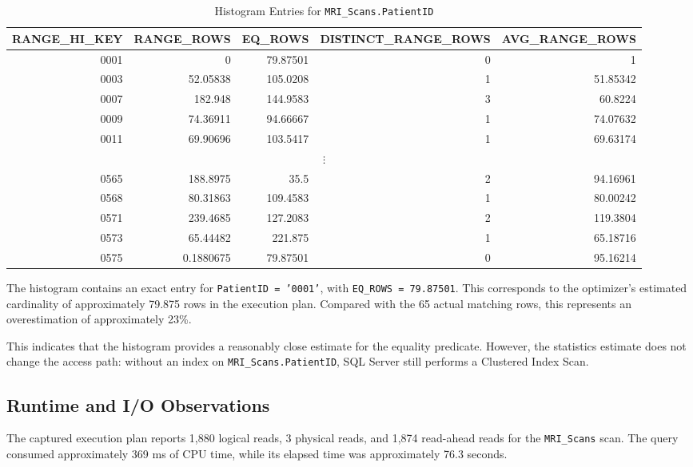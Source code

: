 \begin{table}[htbp]
\centering
\small
\caption{Histogram Entries for \texttt{MRI\_Scans.PatientID}}
\label{tab:q1_patientid_histogram}
\begin{tabular}{|r|r|r|r|r|}
\hline
RANGE\_HI\_KEY & RANGE\_ROWS & EQ\_ROWS &
DISTINCT\_RANGE\_ROWS & AVG\_RANGE\_ROWS \\
\hline
0001 & 0 & 79.87501 & 0 & 1 \\
\hline
0003 & 52.05838 & 105.0208 & 1 & 51.85342 \\
\hline
0007 & 182.948 & 144.9583 & 3 & 60.8224 \\
\hline
0009 & 74.36911 & 94.66667 & 1 & 74.07632 \\
\hline
0011 & 69.90696 & 103.5417 & 1 & 69.63174 \\
\hline
\multicolumn{5}{|c|}{$\vdots$} \\
\hline
0565 & 188.8975 & 35.5 & 2 & 94.16961 \\
\hline
0568 & 80.31863 & 109.4583 & 1 & 80.00242 \\
\hline
0571 & 239.4685 & 127.2083 & 2 & 119.3804 \\
\hline
0573 & 65.44482 & 221.875 & 1 & 65.18716 \\
\hline
0575 & 0.1880675 & 79.87501 & 0 & 95.16214 \\
\hline
\end{tabular}
\end{table}

The histogram contains an exact entry for \texttt{PatientID = '0001'}, with \texttt{EQ\_ROWS = 79.87501}. This corresponds to the optimizer's estimated cardinality of approximately 79.875 rows in the execution plan. Compared with the 65 actual matching rows, this represents an overestimation of approximately 23\%.

This indicates that the histogram provides a reasonably close estimate for the equality predicate. However, the statistics estimate does not change the access path: without an index on \texttt{MRI\_Scans.PatientID}, SQL Server still performs a Clustered Index Scan.

\subsection{Runtime and I/O Observations}

The captured execution plan reports 1,880 logical reads, 3 physical reads, and 1,874 read-ahead reads for the \texttt{MRI\_Scans} scan. The query consumed approximately 369 ms of CPU time, while its elapsed time was approximately 76.3 seconds.

